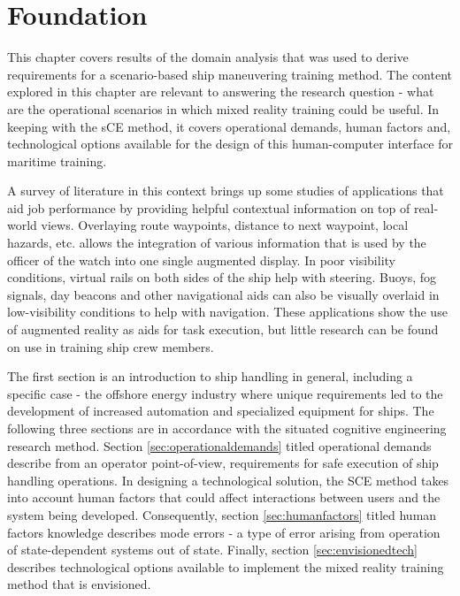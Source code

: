\chapter{Foundation}

This chapter covers results of the domain analysis that was used to derive requirements for a scenario-based ship maneuvering training method. The content explored in this chapter are relevant to answering the research question - what are the operational scenarios in which mixed reality training could be useful. In keeping with the sCE method, it covers operational demands, human factors and, technological options available for the design of this human-computer interface for maritime training. 

A survey of literature in this context brings up some studies of applications that aid job performance by providing helpful contextual information on top of real-world views. Overlaying route waypoints, distance to next waypoint, local hazards, etc. allows the integration of various information that is used by the officer of the watch into one single augmented display. In poor visibility conditions, virtual rails on both sides of the ship help with steering. Buoys, fog signals, day beacons and other navigational aids can also be visually overlaid in low-visibility conditions to help with navigation. These applications show the use of augmented reality as aids for task execution, but little research can be found on use in training ship crew members. 

The first section is an introduction to ship handling in general, including a specific case - the offshore energy industry where unique requirements led to the development of increased automation and specialized equipment for ships. The following three sections are in accordance with the situated cognitive engineering research method. Section \ref{sec:operationaldemands} titled operational demands describe from an operator point-of-view, requirements for safe execution of ship handling operations. In designing a technological solution, the SCE method takes into account human factors that could affect interactions between users and the system being developed. Consequently, section \ref{sec:humanfactors} titled human factors knowledge describes mode errors - a type of error arising from operation of state-dependent systems out of state. Finally, section \ref{sec:envisionedtech} describes technological options available to implement the mixed reality training method that is envisioned.


